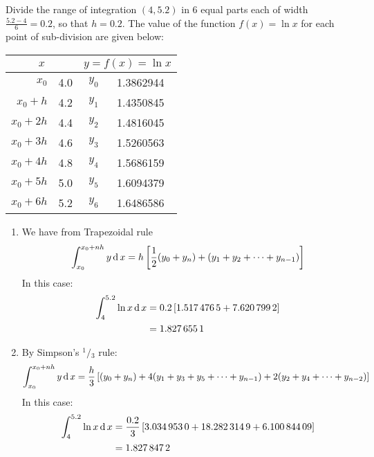\documentclass[12pt,class=book,crop=false]{standalone}
\begin{document}
\begin{soln}
    Divide the range of integration $ (4,5.2) $ in 6 equal parts each of width $ \frac{5.2-4}{6}=0.2 $, so that $ h=0.2 $. The value of the function $ f(x)=\ln x $ for each point of sub-division are given below:
    \begin{table}[H]
        \centering
        \begin{tabular}{r@{ = }S[table-format=1.2]r@{ = }S[table-format=1.7]}
            \toprule
                      &  \\\midrule
            $ x_0$& 4.0 & $y_0$ &1.3862944  \\
            $ x_0+h$&4.2   & $ y_1$& 1.4350845 \\
            $ x_0+2h$&4.4  & $ y_2$& 1.4816045 \\
            $ x_0+3h$&4.6  & $ y_3$& 1.5260563 \\
            $ x_0+4h$&4.8  & $ y_4$& 1.5686159 \\
            $ x_0+5h$&5.0  & $ y_5$& 1.6094379 \\
            $ x_0+6h$&5.2  & $ y_6$& 1.6486586  \\\bottomrule
        \end{tabular}
    \end{table}
    \begin{enumerate}[label=(\roman*)]
        \item We have from Trapezoidal rule
              \[
                  \int_{x_0}^{x_0+nh} y\,\mathrm{d}\, x = h\left[ \frac{1}{2}(y_0+y_n)+(y_1+y_2+\dots+y_{n-1}) \right]
              \]
              In this case:
              \begin{align*}
                  \int_{4}^{5.2} \ln x \,\mathrm{d}\, x & = 0.2\left[ 1.517\,476\,5+7.620\,799\,2\right] \\
                                           & =1.827\,655\,1
              \end{align*}
        \item By Simpson's $ {}^1/{}_3 $ rule:
              \[
                  \int_{x_0}^{x_0+nh} y \,\mathrm{d}\, x =\frac{h}{3}\left[ (y_0+y_n)+4(y_1+y_3+y_5+\dots+y_{n-1})+2(y_2+y_4+\dots+y_{n-2})\right]
              \]
              In this case:
              \begin{align*}
                  \int_{4}^{5.2} \ln x \dx & = \frac{0.2}{3}\left[ 3.034\,953\,0+18.282\,314\,9+6.100\,844\,09\right] \\
                                           & =1.827\,847\,2

\end{align*}
\end{enumerate}
\end{soln}
\end{document}
